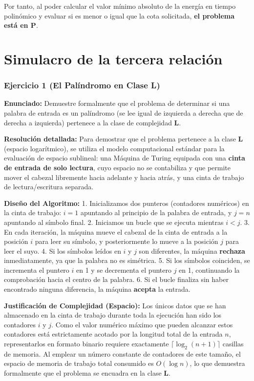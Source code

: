 \documentclass[12pt]{book} %
\begin{document}
Por tanto, al poder calcular el valor mínimo absoluto de la energía en
tiempo polinómico y evaluar si es menor o igual que la cota solicitada,
\textbf{el problema está en P}.

\hypertarget{simulacro-de-la-tercera-relaciuxf3n}{%
\section{Simulacro de la tercera
relación}\label{simulacro-de-la-tercera-relaciuxf3n}}

\hypertarget{ejercicio-1-el-paluxedndromo-en-clase-l}{%
\subsubsection{Ejercicio 1 (El Palíndromo en Clase
L)}\label{ejercicio-1-el-paluxedndromo-en-clase-l}}

\textbf{Enunciado:} Demuestre formalmente que el problema de determinar
si una palabra de entrada es un palíndromo (se lee igual de izquierda a
derecha que de derecha a izquierda) pertenece a la clase de complejidad
\textbf{L}.

\textbf{Resolución detallada:} Para demostrar que el problema pertenece
a la clase \textbf{L} (espacio logarítmico), se utiliza el modelo
computacional estándar para la evaluación de espacio sublineal: una
Máquina de Turing equipada con una \textbf{cinta de entrada de solo
lectura}, cuyo espacio no se contabiliza y que permite mover el cabezal
libremente hacia adelante y hacia atrás, y una cinta de trabajo de
lectura/escritura separada.

\textbf{Diseño del Algoritmo:} 1. Inicializamos dos punteros (contadores
numéricos) en la cinta de trabajo: \(i = 1\) apuntando al principio de
la palabra de entrada, y \(j = n\) apuntando al símbolo final. 2.
Iniciamos un bucle que se ejecuta mientras \(i < j\). 3. En cada
iteración, la máquina mueve el cabezal de la cinta de entrada a la
posición \(i\) para leer su símbolo, y posteriormente lo mueve a la
posición \(j\) para leer el suyo. 4. Si los símbolos leídos en \(i\) y
\(j\) son diferentes, la máquina \textbf{rechaza} inmediatamente, ya que
la palabra no es simétrica. 5. Si los símbolos coinciden, se incrementa
el puntero \(i\) en 1 y se decrementa el puntero \(j\) en 1, continuando
la comprobación hacia el centro de la palabra. 6. Si el bucle finaliza
sin haber encontrado ninguna diferencia, la máquina \textbf{acepta} la
entrada.

\textbf{Justificación de Complejidad (Espacio):} Los únicos datos que se
han almacenado en la cinta de trabajo durante toda la ejecución han sido
los contadores \(i\) y \(j\). Como el valor numérico máximo que pueden
alcanzar estos contadores está estrictamente acotado por la longitud
total de la entrada \(n\), representarlos en formato binario requiere
exactamente \(\lceil \log_2(n+1) \rceil\) casillas de memoria. Al
emplear un número constante de contadores de este tamaño, el espacio de
memoria de trabajo total consumido es \textbf{\(O(\log n)\)}, lo que
demuestra formalmente que el problema se encuadra en la clase
\textbf{L}.
\end{document}
